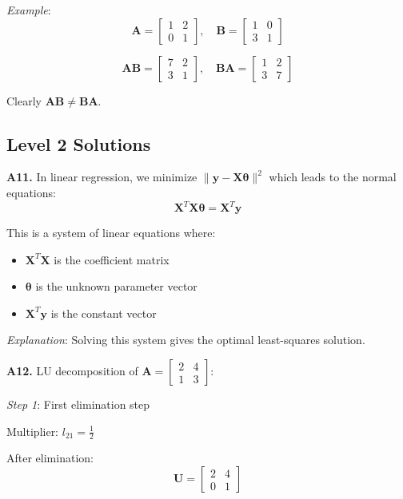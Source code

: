 \documentclass[12pt,a4paper]{article}
\theoremstyle{definition}
\begin{document}
\textit{Example}:
\[
\mathbf{A} = \begin{bmatrix} 1 & 2 \\ 0 & 1 \end{bmatrix}, \quad \mathbf{B} = \begin{bmatrix} 1 & 0 \\ 3 & 1 \end{bmatrix}
\]

\[
\mathbf{AB} = \begin{bmatrix} 7 & 2 \\ 3 & 1 \end{bmatrix}, \quad \mathbf{BA} = \begin{bmatrix} 1 & 2 \\ 3 & 7 \end{bmatrix}
\]

Clearly $\mathbf{AB} \neq \mathbf{BA}$.

\subsection{Level 2 Solutions}

\textbf{A11.} In linear regression, we minimize $\|\mathbf{y} - \mathbf{X}\boldsymbol{\theta}\|^2$ which leads to the normal equations:
\[
\mathbf{X}^T\mathbf{X}\boldsymbol{\theta} = \mathbf{X}^T\mathbf{y}
\]

This is a system of linear equations where:
\begin{itemize}
\item $\mathbf{X}^T\mathbf{X}$ is the coefficient matrix
\item $\boldsymbol{\theta}$ is the unknown parameter vector
\item $\mathbf{X}^T\mathbf{y}$ is the constant vector
\end{itemize}

\textit{Explanation}: Solving this system gives the optimal least-squares solution.

\textbf{A12.} LU decomposition of $\mathbf{A} = \begin{bmatrix} 2 & 4 \\ 1 & 3 \end{bmatrix}$:

\textit{Step 1}: First elimination step

Multiplier: $l_{21} = \frac{1}{2}$

After elimination:
\[
\mathbf{U} = \begin{bmatrix} 2 & 4 \\ 0 & 1 \end{bmatrix}
\]
\end{document}
